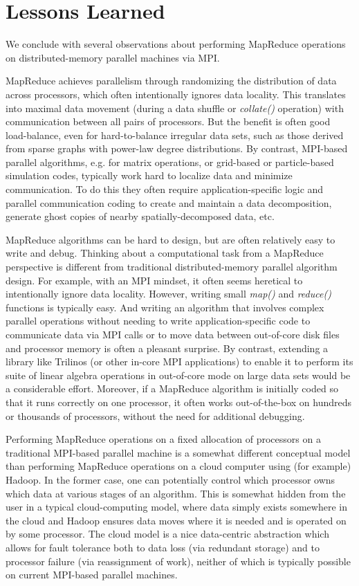 \section{Lessons Learned}
\label{sec:lessons}

We conclude with several observations about performing MapReduce
operations on distributed-memory parallel machines via MPI.

MapReduce achieves parallelism through randomizing the distribution of
data across processors, which often intentionally ignores data
locality.  This translates into maximal data movement (during a data
shuffle or {\it collate()} operation) with communication between all
pairs of processors.  But the benefit is often good load-balance, even
for hard-to-balance irregular data sets, such as those derived from
sparse graphs with power-law degree distributions.  By contrast,
MPI-based parallel algorithms, e.g. for matrix operations, or
grid-based or particle-based simulation codes, typically work hard to
localize data and minimize communication.  To do this they often
require application-specific logic and parallel communication coding
to create and maintain a data decomposition, generate ghost copies of
nearby spatially-decomposed data, etc.

MapReduce algorithms can be hard to design, but are often relatively
easy to write and debug.  Thinking about a computational task from a
MapReduce perspective is different from traditional distributed-memory
parallel algorithm design.  For example, with an MPI mindset, it often
seems heretical to intentionally ignore data locality.  However,
writing small {\it map()} and {\it reduce()} functions is typically
easy.  And writing an algorithm that involves complex parallel
operations without needing to write application-specific code to
communicate data via MPI calls or to move data between out-of-core
disk files and processor memory is often a pleasant surprise.  By
contrast, extending a library like Trilinos (or other in-core MPI
applications) to enable it to perform its suite of linear algebra
operations in out-of-core mode on large data sets would be a
considerable effort.  Moreover, if a MapReduce algorithm is initially
coded so that it runs correctly on one processor, it often works
out-of-the-box on hundreds or thousands of processors, without the
need for additional debugging.

Performing MapReduce operations on a fixed allocation of processors on
a traditional MPI-based parallel machine is a somewhat different
conceptual model than performing MapReduce operations on a cloud
computer using (for example) Hadoop.  In the former case, one can
potentially control which processor owns which data at various stages
of an algorithm.  This is somewhat hidden from the user in a typical
cloud-computing model, where data simply exists somewhere in the cloud
and Hadoop ensures data moves where it is needed and is operated on by
some processor.  The cloud model is a nice data-centric abstraction
which allows for fault tolerance both to data loss (via redundant
storage) and to processor failure (via reassignment of work), neither
of which is typically possible on current MPI-based parallel machines.

